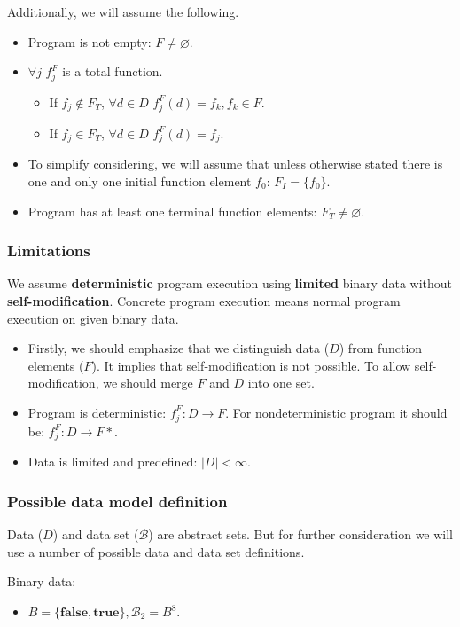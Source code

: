 \documentclass[fleqn,oneside,a4]{article}
\newcommand{\subsublevel}{\subsubsection}
\newcommand{\ra}{\rightarrow}
\newcommand{\true}{\textbf{true}}
\newcommand{\false}{\textbf{false}}
\begin{document}
Additionally, we will assume the following.
\begin{itemize}
    \item Program is not empty: $F \neq \varnothing$.
    \item $\forall j \,\, f^F_j$ is a total function.
    \begin{itemize}
        \item If $f_j \notin F_T$,
            $\forall d \in D \,\, f^F_j(d) = f_k, f_k \in F$.
        \item If $f_j \in F_T$,
            $\forall d \in D \,\, f^F_j(d) = f_j$.
    \end{itemize}
    \item To simplify considering, we will assume that unless otherwise stated
        there is one and only one initial function element $f_0$:
        $F_I = \{f_0\}$.
    \item Program has at least one terminal function elements:
        $F_T \neq \varnothing$.
\end{itemize}

\subsublevel*{Limitations}

We assume \textbf{deterministic} program execution
using \textbf{limited} binary data without \textbf{self-modification}.
Concrete program execution means normal program execution on given binary data.

\begin{itemize}
    \item Firstly, we should emphasize that we distinguish data ($D$)
        from function elements ($F$).
        It implies that self-modification is not possible.
        To allow self-modification, we should merge $F$ and $D$ into one set.
    \item Program is deterministic: $f^F_j: D \ra F$.
        For nondeterministic program it should be: $f^F_j: D \ra F*$.
    \item Data is limited and predefined: $|D| < \infty$.
\end{itemize}

\subsublevel*{Possible data model definition}

Data ($D$) and data set ($\mathcal{B}$) are abstract sets.
But for further consideration we will use a number of
possible data and data set definitions.

Binary data:
\begin{itemize}
    \item $B = \{\false, \true\}, \mathcal{B}_2 = B^8$.
\end{itemize}
\end{document}
